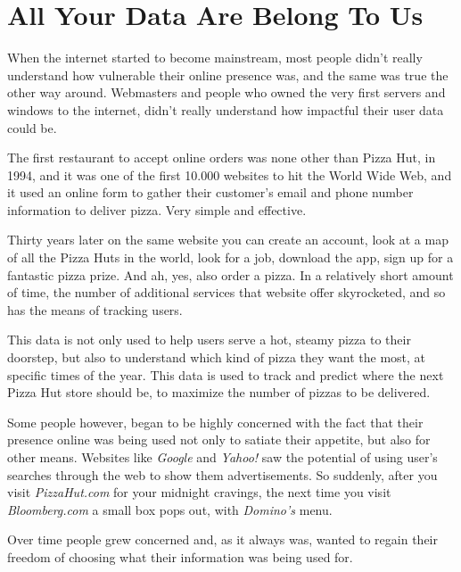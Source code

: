 \section{All Your Data Are Belong To Us}

When the internet started to become mainstream, most people didn't really understand how vulnerable their online presence was, and the same was true the other way around. Webmasters and people who owned the very first servers and windows to the internet, didn't really understand how impactful their user data could be.

The first restaurant to accept online orders was none other than Pizza Hut, in 1994, and it was one of the first 10.000 websites to hit the World Wide Web, and it used an online form to gather their customer's email and phone number information to deliver pizza. Very simple and effective.

Thirty years later on the same website you can create an account, look at a map of all the Pizza Huts in the world, look for a job, download the app, sign up for a fantastic pizza prize. And ah, yes, also order a pizza. In a relatively short amount of time, the number of additional services that website offer skyrocketed, and so has the means of tracking users.

This data is not only used to help users serve a hot, steamy pizza to their doorstep, but also to understand which kind of pizza they want the most, at specific times of the year. This data is used to track and predict where the next Pizza Hut store should be, to maximize the number of pizzas to be delivered.

Some people however, began to be highly concerned with the fact that their presence online was being used not only to satiate their appetite, but also for other means. Websites like \textit{Google} and \textit{Yahoo!} saw the potential of using user's searches through the web to show them advertisements. So suddenly, after you visit \textit{PizzaHut.com} for your midnight cravings, the next time you visit \textit{Bloomberg.com} a small box pops out, with \textit{Domino's} menu.

Over time people grew concerned and, as it always was, wanted to regain their freedom of choosing what their information was being used for.
